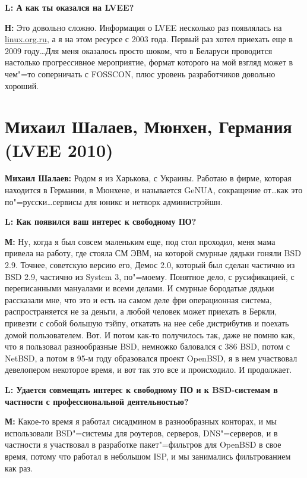 \documentclass[10pt, a5paper]{article}
\begin{document}
{\noindent \bf L: А как ты оказался на LVEE?}

{\noindent \bf Н:} Это довольно сложно. Информация о LVEE несколько раз появлялась на \url{linux.org.ru}, а я на этом ресурсе с 2003 года. 
Первый раз хотел приехать еще в 2009 году\ldots Для меня оказалось просто шоком, что в Беларуси проводится настолько прогрессивное мероприятие, формат которого на мой взгляд может в чем"=то соперничать с FOSSCON, плюс уровень разработчиков довольно хороший. 

\section[Михаил Шалаев, Мюнхен, Германия (LVEE 2010)]{Михаил Шалаев, Мюнхен, Германия \linebreak (LVEE 2010)}


{\noindent \bf Михаил Шалаев:} Родом я из Харькова, с Украины. Работаю в фирме, которая находится в Германии, в Мюнхене, и называется GeNUA, сокращение от\ldots  как это по"=русски\ldots сервисы для юникс и нетворк администрэйшн.

{\noindent \bf L: Как появился ваш интерес к свободному ПО?}

{\noindent \bf М:} Ну, когда я был совсем маленьким еще, под стол проходил, меня мама привела на работу, где стояла СМ ЭВМ, на которой смурные дядьки гоняли BSD 2.9. Точнее, советскую версию его, Демос 2.0, который был сделан частично из BSD 2.9, частично из System 3, по"=моему. Понятное дело, с русификацией, с переписанными мануалами и всеми делами. И смурные бородатые дядьки рассказали мне, что это и есть на самом деле фри операционная система, распространяется не за деньги, а любой человек может приехать в Беркли, привезти с собой большую тэйпу, откатать на нее себе дистрибутив и поехать домой пользователем. Вот. И потом как-то получилось так, даже не помню как, что я пользовал разнообразные BSD, немножко баловался с 386 BSD, потом с NetBSD, а потом в 95-м году образовался проект OpenBSD, я в нем участвовал девелопером некоторое время, и вот так это все и происходило. И продолжает.

{\noindent \bf L:  Удается совмещать интерес к свободному ПО и к BSD-системам в частности с профессиональной деятельностью?}

{\noindent \bf М:} Какое-то время я работал сисадмином в разнообразных конторах, и мы использовали BSD"=системы для роутеров, серверов, DNS"=серверов, и в частности я участвовал в разработке пакет"=фильтров для OpenBSD в свое время, потому что работал в небольшом ISP, и мы занимались фильтрованием как раз. 
\end{document}
